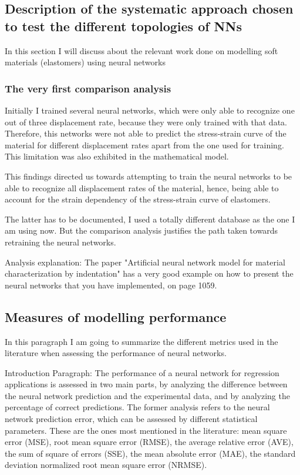 \subsection{Description of the systematic approach chosen to test the different topologies of NNs} 
 In this section I will discuss about the relevant work done on modelling soft materials (elastomers) using neural networks
 
\subsubsection{The very first comparison analysis}

Initially I trained several neural networks, which were only able to recognize one out of three displacement rate, because they were only trained with that data. Therefore, this networks were not able to predict the stress-strain curve of the material for different displacement rates apart from the one used for training. This limitation was also exhibited in the mathematical model.

This findings directed us towards attempting to train the neural networks to be able to recognize all displacement rates of the material, hence, being able to account for the strain dependency of the stress-strain curve of elastomers.

The latter has to be documented, I used a totally different database as the one I am using now. But the comparison analysis justifies the path taken towards retraining the neural networks.

Analysis explanation: The paper "Artificial neural network model for material characterization by indentation" has a very good example on how to present the neural networks that you have implemented, on page 1059. 

\subsection{Measures of modelling performance}
 
In this paragraph I am going to summarize the different metrics used in the literature when assessing the performance of neural networks.

Introduction Paragraph: The performance of a neural network for regression applications is assessed in two main parts, by analyzing the difference between the neural network prediction and the experimental data, and by analyzing the percentage of correct predictions. The former analysis refers to the neural network prediction error, which can be assessed by different statistical parameters. These are the ones most mentioned in the literature: mean square error (MSE), root mean square error (RMSE), the average relative error (AVE), the sum of square of errors (SSE), the mean absolute error (MAE), the standard deviation normalized root mean square error (NRMSE). 

